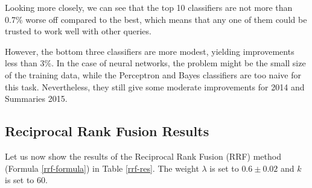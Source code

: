 Looking more closely, we can see that the top 10 classifiers are not more than 0.7\% worse off compared to the best,
which means that any one of them could be trusted to work well with other queries.

However, the bottom three classifiers are more modest, yielding improvements less than 3\%.
In the case of neural networks, the problem might be the small size of the training data,
while the Perceptron and Bayes classifiers are too naive for this task.
Nevertheless, they still give some moderate improvements for 2014 and Summaries 2015.

\subsection{Reciprocal Rank Fusion Results}
Let us now show the results of the Reciprocal Rank Fusion (RRF) method (Formula \ref{rrf-formula}) in Table \ref{rrf-res}.
The weight $\lambda$ is set to $0.6\pm 0.02$ and $k$ is set to 60.

